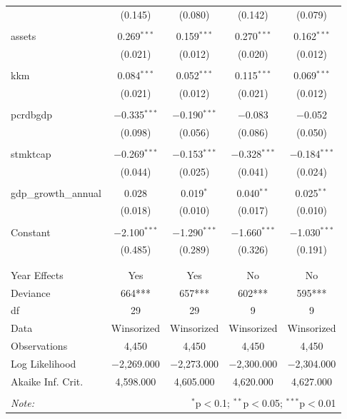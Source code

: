 \documentclass[a4paper, nobind]{templates/ociamthesis}
\begin{document}
\begin{table}[!htbp]
\begin{tabular}{@{\extracolsep{5pt}}lcccc}
  & (0.145) & (0.080) & (0.142) & (0.079) \\ 
  & & & & \\ 
 assets & 0.269$^{***}$ & 0.159$^{***}$ & 0.270$^{***}$ & 0.162$^{***}$ \\ 
  & (0.021) & (0.012) & (0.020) & (0.012) \\ 
  & & & & \\ 
 kkm & 0.084$^{***}$ & 0.052$^{***}$ & 0.115$^{***}$ & 0.069$^{***}$ \\ 
  & (0.021) & (0.012) & (0.021) & (0.012) \\ 
  & & & & \\ 
 pcrdbgdp & $-$0.335$^{***}$ & $-$0.190$^{***}$ & $-$0.083 & $-$0.052 \\ 
  & (0.098) & (0.056) & (0.086) & (0.050) \\ 
  & & & & \\ 
 stmktcap & $-$0.269$^{***}$ & $-$0.153$^{***}$ & $-$0.328$^{***}$ & $-$0.184$^{***}$ \\ 
  & (0.044) & (0.025) & (0.041) & (0.024) \\ 
  & & & & \\ 
 gdp\_growth\_annual & 0.028 & 0.019$^{*}$ & 0.040$^{**}$ & 0.025$^{**}$ \\ 
  & (0.018) & (0.010) & (0.017) & (0.010) \\ 
  & & & & \\ 
 Constant & $-$2.100$^{***}$ & $-$1.290$^{***}$ & $-$1.660$^{***}$ & $-$1.030$^{***}$ \\ 
  & (0.485) & (0.289) & (0.326) & (0.191) \\ 
  & & & & \\ 
\hline \\[-1.8ex] 
Year Effects & Yes & Yes & No & No \\ 
Deviance & 664*** & 657*** & 602*** & 595*** \\ 
df & 29 & 29 & 9 & 9 \\ 
Data & Winsorized & Winsorized & Winsorized & Winsorized \\ 
Observations & 4,450 & 4,450 & 4,450 & 4,450 \\ 
Log Likelihood & $-$2,269.000 & $-$2,273.000 & $-$2,300.000 & $-$2,304.000 \\ 
Akaike Inf. Crit. & 4,598.000 & 4,605.000 & 4,620.000 & 4,627.000 \\ 
\hline 
\hline \\[-1.8ex] 
\textit{Note:}  & \multicolumn{4}{r}{$^{*}$p$<$0.1; $^{**}$p$<$0.05; $^{***}$p$<$0.01} \\ 
\end{tabular} 
\end{table}
\end{document}
